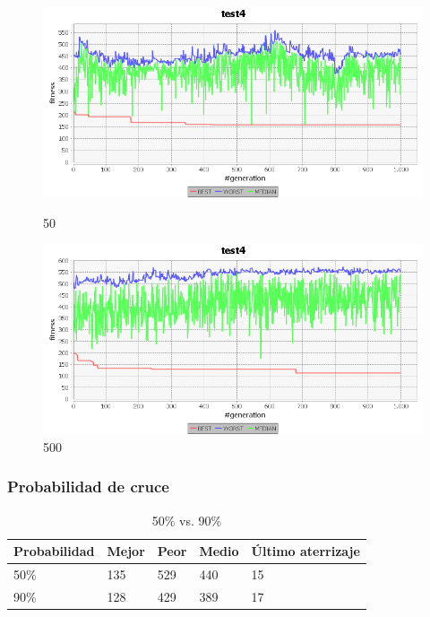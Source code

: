\documentclass[a4paper,12pt,titlepage]{article}
\begin{document}
\begin{figure}[!ht]
\centering
\begin{minipage}{.5\textwidth}
  \centering
  \includegraphics[width=\textwidth]{50tam.png}
  \caption{50}
\end{minipage}%
\begin{minipage}{.5\textwidth}
  \centering
  \includegraphics[width=\textwidth]{500tam.png}
  \caption{500}
\end{minipage}
\end{figure}

\subsubsection{Probabilidad de cruce}

\begin{table}[!ht]
\centering
\begin{tabular}{@{}lllll@{}}
\toprule
Probabilidad & Mejor & Peor & Medio & Último aterrizaje \\ \midrule
50\%         & 135   & 529  & 440   & 15                \\
90\%         & 128   & 429  & 389   & 17                \\ \bottomrule
\end{tabular}
\caption{50\% vs. 90\%}
\end{table}
\end{document}
